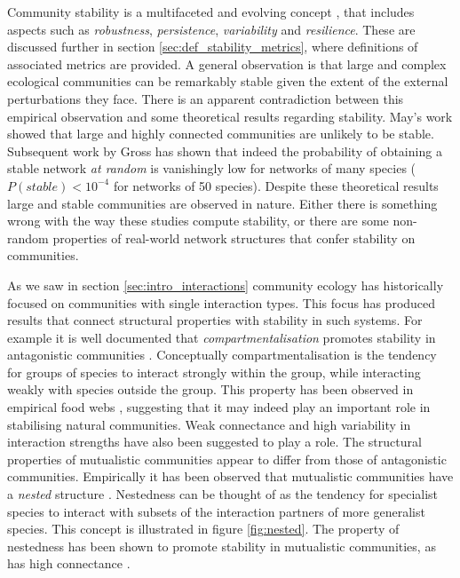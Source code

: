 Community stability is a multifaceted and evolving concept \cite{lurgi2015effects,montoya2016invariability,arnoldi2015,wang2006inferring}, that includes aspects such as \emph{robustness}, \emph{persistence}, \emph{variability} and \emph{resilience}. These are discussed further in section \ref{sec:def_stability_metrics}, where definitions of associated metrics are provided. A general observation is that large and complex ecological communities can be remarkably stable given the extent of the external perturbations they face. There is an apparent contradiction between this empirical observation and some theoretical results regarding stability. May's work \cite{may1972will} showed that large and highly connected communities are unlikely to be stable. Subsequent work by Gross \cite{gross2009generalized} has shown that indeed the probability of obtaining a stable network \emph{at random} is vanishingly low for networks of many species ($P(stable) < 10^{-4}$ for networks of 50 species). Despite these theoretical results large and stable communities are observed in nature. Either there is something wrong with the way these studies compute stability, or there are some non-random properties of real-world network structures that confer stability on communities.  


As we saw in section \ref{sec:intro_interactions} community ecology has historically focused on communities with single interaction types. This focus has produced results that connect structural properties with stability in such systems. For example it is well documented that \emph{compartmentalisation} promotes stability in antagonistic communities \cite{stouffer2011compartmentalization,thebault2010stability}. Conceptually compartmentalisation is the tendency for groups of species to interact strongly within the group, while interacting weakly with species outside the group. This property has been observed in empirical food webs \cite{stouffer2011compartmentalization}, suggesting that it may indeed play an important role in stabilising natural communities. Weak connectance \cite{may1972will,thebault2010stability} and high variability in interaction strengths \cite{van2016food, jansen2003complexity} have also been suggested to play a role. The structural properties of mutualistic communities appear to differ from those of antagonistic communities. Empirically it has been observed that mutualistic communities have a \emph{nested} structure \cite{bascompte2007plant}. Nestedness can be thought of as the tendency for specialist species to interact with subsets of the interaction partners of more generalist species. This concept is illustrated in figure \ref{fig:nested}. The property of nestedness has been shown to promote stability in mutualistic communities, as has high connectance \cite{thebault2010stability}. 


